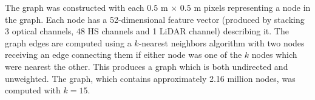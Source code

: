 \documentclass[
twocolumn,
]{ceurart}
\begin{document}
The graph was constructed with each $0.5$ m $\times$ $0.5$ m pixels representing a node in the graph.
Each node has a 52-dimensional feature vector (produced by stacking 3 optical channels, 48 HS channels and 1 LiDAR channel) describing it.
The graph edges are computed using a $k$-nearest neighbors algorithm with two nodes receiving an edge connecting them if either node was one of the $k$ nodes which were nearest the other.
This produces a graph which is both undirected and unweighted.
The graph, which contains approximately 2.16 million nodes, was computed with $k=15$.

\end{document}
